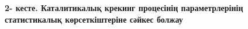 
{\bfseries 2- кесте. Каталитикалық крекинг процесінің параметрлерінің
статистикалық көрсеткіштеріне сәйкес болжау}

